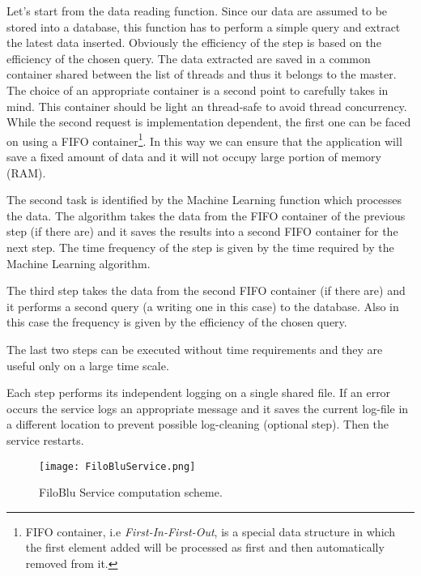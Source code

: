 \documentclass{standalone}
\begin{document}
Let's start from the data reading function.
Since our data are assumed to be stored into a database, this function has to perform a simple query and extract the latest data inserted.
Obviously the efficiency of the step is based on the efficiency of the chosen query.
The data extracted are saved in a common container shared between the list of threads and thus it belongs to the master.
The choice of an appropriate container is a second point to carefully takes in mind.
This container should be light an thread-safe to avoid thread concurrency.
While the second request is implementation dependent, the first one can be faced on using a \textsf{FIFO} container\footnote{
  FIFO container, i.e \emph{First-In-First-Out}, is a special data structure in which the first element added will be processed as first and then automatically removed from it.
}.
In this way we can ensure that the application will save a fixed amount of data and it will not occupy large portion of memory (RAM).

The second task is identified by the Machine Learning function which processes the data.
The algorithm takes the data from the \textsf{FIFO} container of the previous step (if there are) and it saves the results into a second \textsf{FIFO} container for the next step.
The time frequency of the step is given by the time required by the Machine Learning algorithm.

The third step takes the data from the second \textsf{FIFO} container (if there are) and it performs a second query (a writing one in this case) to the database.
Also in this case the frequency is given by the efficiency of the chosen query.

The last two steps can be executed without time requirements and they are useful only on a large time scale.

Each step performs its independent logging on a single shared file.
If an error occurs the service logs an appropriate message and it saves the current log-file in a different location to prevent possible log-cleaning (optional step).
Then the service restarts.

\begin{figure}[htbp]
\centering
\texttt{[image: FiloBluService.png]}
\caption{FiloBlu Service computation scheme.
}
\label{fig:FiloBlu}
\end{figure}
\end{document}

